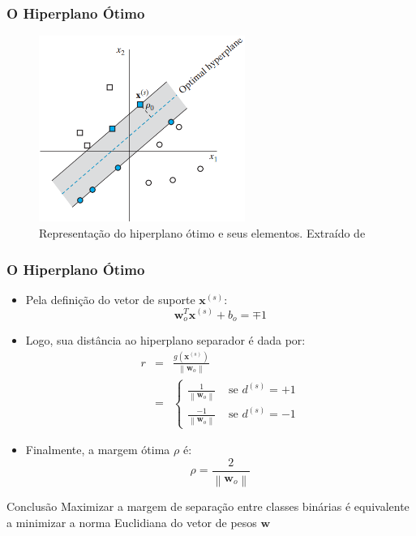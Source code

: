 \documentclass{beamer}
\begin{document}
\begin{frame}
	\frametitle{O Hiperplano Ótimo}
	\begin{figure}[h!]
		\centering
		\includegraphics[width=0.6\textwidth]{fig03.png}
		\caption{Representação do hiperplano ótimo e seus elementos. Extraído de \cite{haykin}}
		\label{fig:haykin-01}
	\end{figure}
\end{frame}


\begin{frame}
	\frametitle{O Hiperplano Ótimo}
	
	\begin{itemize}
		\item Pela definição do vetor de suporte $\textbf{x}^{(s)}$:
		\begin{equation}
			\textbf{w}^T_o\textbf{x}^{(s)} + b_o = \mp 1
			\label{eq:support-vectors}
		\end{equation}	
		\item Logo, sua distância ao hiperplano separador é dada por:
		\begin{eqnarray}
		r &=& \frac{g(\textbf{x}^{(s)})}{\left \| \textbf{w}_o \right \|} \\
		  &=& \begin{cases}
			\frac{1}{\left \| \textbf{w}_o \right \|} & \text{ se } d^{(s)}= +1\\ 
			\frac{-1}{\left \| \textbf{w}_o \right \|}& \text{ se } d^{(s)}= -1 
		\end{cases}
		\end{eqnarray}
		\item Finalmente, a margem ótima $\rho$ é:
		\begin{equation}
			\rho = \frac{2}{\left \| \textbf{w}_o \right \|}
			\label{eq:margin-opt}
		\end{equation}
	\end{itemize}	
	
	\begin{block}{Conclusão}
		Maximizar a margem de separação entre classes binárias é equivalente a minimizar a norma Euclidiana do vetor de pesos $\textbf{w}$
	\end{block}

\end{frame}
\end{document}
